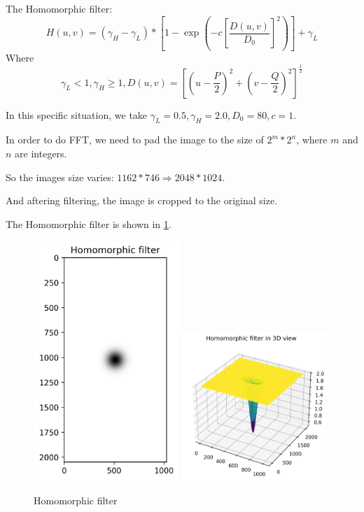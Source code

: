 The Homomorphic filter:
$$H(u,v)=(\gamma_H-\gamma_L)*\left[1-\exp\left(-c\left[\dfrac{D(u,v)}{D_0}\right]^2\right)\right]+\gamma_L$$
Where
$$\gamma_L<1,\gamma_H\geq 1,D(u,v)=\left[\left(u-\dfrac{P}{2}\right)^2+\left(v-\dfrac{Q}{2}\right)^2\right]^\frac{1}{2}$$

In this specific situation, we take $\gamma_L = 0.5, \gamma_H = 2.0, D_0 = 80, c = 1$.

In order to do FFT, we need to pad the image to the size of $2^m*2^n$, where $m$ and $n$ are integers.

So the images size varies: $1162*746\Rightarrow 2048*1024$.

And aftering filtering, the image is cropped to the original size.

The Homomorphic filter is shown in \ref{fig:p2_filter}.
\begin{figure}[htbp]
    \centering
	\includegraphics[width=0.49\textwidth]{../images/p2/p2a_filter.png}
	\includegraphics[width=0.49\textwidth]{../images/p2/p2a_filter_3D.png}
    \caption{Homomorphic filter}
    \label{fig:p2_filter}
\end{figure}
\\

